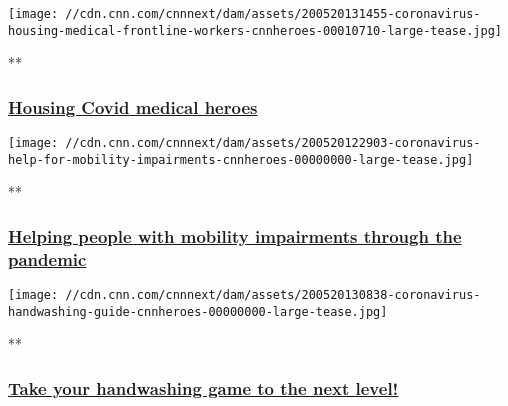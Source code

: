 \href{/videos/tv/2020/05/20/coronavirus-housing-medical-frontline-workers-cnnheroes.cnn}{}

\texttt{[image: //cdn.cnn.com/cnnnext/dam/assets/200520131455-coronavirus-housing-medical-frontline-workers-cnnheroes-00010710-large-tease.jpg]}

**

\hypertarget{housing-covid-medical-heroes}{%
\subsubsection{\texorpdfstring{\href{/videos/tv/2020/05/20/coronavirus-housing-medical-frontline-workers-cnnheroes.cnn}{Housing
Covid medical
heroes}}{Housing Covid medical heroes}}\label{housing-covid-medical-heroes}}

\href{/videos/tv/2020/05/19/coronavirus-help-for-mobility-impairments-cnnheroes.cnn}{}

\texttt{[image: //cdn.cnn.com/cnnnext/dam/assets/200520122903-coronavirus-help-for-mobility-impairments-cnnheroes-00000000-large-tease.jpg]}

**

\hypertarget{helping-people-with-mobility-impairments-through-the-pandemic}{%
\subsubsection{\texorpdfstring{\href{/videos/tv/2020/05/19/coronavirus-help-for-mobility-impairments-cnnheroes.cnn}{Helping
people with mobility impairments through the
pandemic}}{Helping people with mobility impairments through the pandemic}}\label{helping-people-with-mobility-impairments-through-the-pandemic}}

\href{/videos/tv/2020/05/19/coronavirus-handwashing-guide-cnnheroes.cnn}{}

\texttt{[image: //cdn.cnn.com/cnnnext/dam/assets/200520130838-coronavirus-handwashing-guide-cnnheroes-00000000-large-tease.jpg]}

**

\hypertarget{take-your-handwashing-game-to-the-next-level}{%
\subsubsection{\texorpdfstring{\href{/videos/tv/2020/05/19/coronavirus-handwashing-guide-cnnheroes.cnn}{Take
your handwashing game to the next
level!}}{Take your handwashing game to the next level!}}\label{take-your-handwashing-game-to-the-next-level}}

